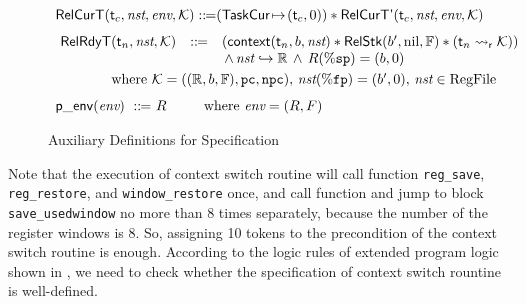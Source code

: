\begin{figure}[!t]
\[\begin{array}{l}
            \\[-5pt]
            \RelCurT{\thrdid_c}{\nst}{\env}{\hthrdlocalst} \define 
            (\msto{\TaskCur}{(\thrdid_c, 0)}) \sepstar 
            \RelCurTAux{\thrdid_c}{\nst}{\env}{\hthrdlocalst} \\
            \\[-5pt]
            \hspace*{-0.15em}
            \begin{array}{lll}
                \RelRdyT{\thrdid_n}{\nst}{\hthrdlocalst} & \define & 
                (\relcontext{\thrdid_n}{\block}{\nst}
                \sepstar 
                \RelStk{\block'}{\nil}{\hWstk} \sepstar 
                (\astRdyCont{\thrdid_n}{\hthrdlocalst})) \\
                & &  
                \, \land \, 
                \Rinj{\nst}{\hRfile} \, \land \, \RFile(\spreg) = (\block, 0)
            \end{array}  \\
            \\[-9pt]
            \qquad\qquad
            \text{where} \ \hthrdlocalst = ((\hRfile, \block, \hWstk), \pc, \npc), 
            \, \nst(\fpreg) = (\block', 0), \, \nst \in \text{RegFile} \\
            \\[-5pt]
            \pEnv{\env} \ \define \ \RFile \qquad \ \ \text{where} \ \env = (\RFile, \Wstack) 
        \end{array}
    \]
    \caption{Auxiliary Definitions for Specification}
    \label{def:aux-def-spec}
\end{figure}

Note that the execution of context switch routine will 
call function \texttt{reg\_save}, \texttt{reg\_restore}, and  
\texttt{window\_restore} once, and call function \WinSave{} 
and jump to block \texttt{save\_usedwindow} no more than 8 times separately, 
because the number of the register windows is 8. So, assigning 10 tokens 
to the precondition of the context switch routine is enough. 
According to the logic rules of extended program logic shown 
in \Fig{\ref{fig:Selected Inference Rules for Refinement Verification}}, 
we need to check whether the specification of context switch rountine 
is well-defined. 


